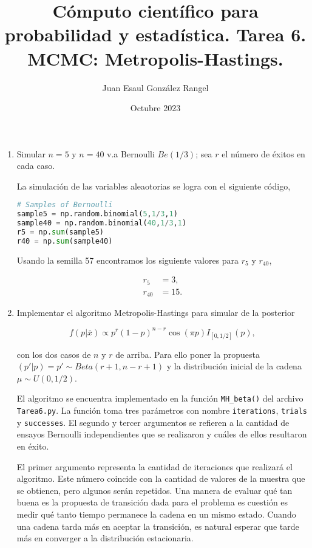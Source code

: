 \documentclass{article}
\title{Cómputo científico para probabilidad y estadística. Tarea 6.\\
MCMC: Metropolis-Hastings.}
\author{Juan Esaul González Rangel}
\date{Octubre 2023}
\begin{document}
\maketitle


\begin{enumerate}

    \item  Simular $n = 5$ y $n = 40$ v.a Bernoulli $Be(1/3)$; sea $r$ el número de
éxitos en cada caso.

    La simulación de las variables aleaotorias se logra con el siguiente código,

    \begin{lstlisting}[language=Python]
# Samples of Bernoulli
sample5 = np.random.binomial(5,1/3,1)
sample40 = np.random.binomial(40,1/3,1)
r5 = np.sum(sample5)
r40 = np.sum(sample40)\end{lstlisting}

    Usando la semilla 57 encontramos los siguiente valores para $r_5$ y $r_{40}$,

    \begin{align*}
        r_5 &= 3,\\
        r_{40} &= 15.
    \end{align*}

    \item Implementar el algoritmo Metropolis-Hastings para simular de la posterior
    
    \[f (p|\bar{x}) \propto p^r(1 - p)^{n-r} \cos(\pi p)I_{[0, 1/2 ]}(p),\]

    con los dos casos de $n$ y $r$ de arriba. Para ello poner la propuesta $(p'|p) = p' \sim Beta(r + 1, n - r + 1)$ 
    y la distribución inicial de la cadena $\mu \sim U (0, 1/2 )$.

    El algoritmo se encuentra implementado en la función \texttt{MH\_beta()} del archivo
    \texttt{Tarea6.py}. La función toma tres parámetros con nombre \texttt{iterations}, \texttt{trials}
    y \texttt{successes}. El segundo y tercer argumentos se refieren a la cantidad de ensayos
    Bernoulli independientes que se realizaron y cuáles de ellos resultaron en éxito. 
    
    El primer argumento representa la cantidad de iteraciones que realizará el algoritmo. 
    Este número coincide con la cantidad de valores de la muestra que
    se obtienen, pero algunos serán repetidos. Una manera de evaluar qué tan buena es la
    propuesta de transición dada para el problema es cuestión es medir qué tanto 
    tiempo permanece la cadena en un mismo estado. Cuando una cadena tarda más en aceptar
    la transición, es natural esperar que tarde más en converger a la distribución estacionaria.


\end{enumerate}
\end{document}
